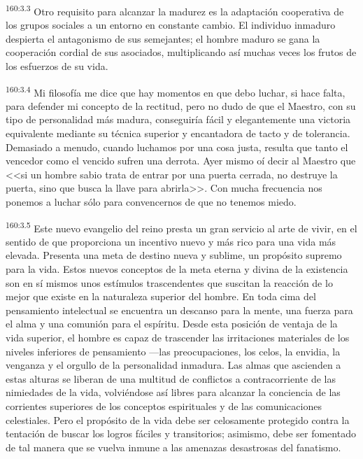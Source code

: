 \par 
\textsuperscript{160:3.3} Otro requisito para alcanzar la madurez es la adaptación cooperativa de los grupos sociales a un entorno en constante cambio. El individuo inmaduro despierta el antagonismo de sus semejantes; el hombre maduro se gana la cooperación cordial de sus asociados, multiplicando así muchas veces los frutos de los esfuerzos de su vida.

\par 
\textsuperscript{160:3.4} Mi filosofía me dice que hay momentos en que debo luchar, si hace falta, para defender mi concepto de la rectitud, pero no dudo de que el Maestro, con su tipo de personalidad más madura, conseguiría fácil y elegantemente una victoria equivalente mediante su técnica superior y encantadora de tacto y de tolerancia. Demasiado a menudo, cuando luchamos por una cosa justa, resulta que tanto el vencedor como el vencido sufren una derrota. Ayer mismo oí decir al Maestro que <<si un hombre sabio trata de entrar por una puerta cerrada, no destruye la puerta, sino que busca la llave para abrirla>>. Con mucha frecuencia nos ponemos a luchar sólo para convencernos de que no tenemos miedo.

\par 
\textsuperscript{160:3.5} Este nuevo evangelio del reino presta un gran servicio al arte de vivir, en el sentido de que proporciona un incentivo nuevo y más rico para una vida más elevada. Presenta una meta de destino nueva y sublime, un propósito supremo para la vida. Estos nuevos conceptos de la meta eterna y divina de la existencia son en sí mismos unos estímulos trascendentes que suscitan la reacción de lo mejor que existe en la naturaleza superior del hombre. En toda cima del pensamiento intelectual se encuentra un descanso para la mente, una fuerza para el alma y una comunión para el espíritu. Desde esta posición de ventaja de la vida superior, el hombre es capaz de trascender las irritaciones materiales de los niveles inferiores de pensamiento ---las preocupaciones, los celos, la envidia, la venganza y el orgullo de la personalidad inmadura. Las almas que ascienden a estas alturas se liberan de una multitud de conflictos a contracorriente de las nimiedades de la vida, volviéndose así libres para alcanzar la conciencia de las corrientes superiores de los conceptos espirituales y de las comunicaciones celestiales. Pero el propósito de la vida debe ser celosamente protegido contra la tentación de buscar los logros fáciles y transitorios; asimismo, debe ser fomentado de tal manera que se vuelva inmune a las amenazas desastrosas del fanatismo.

